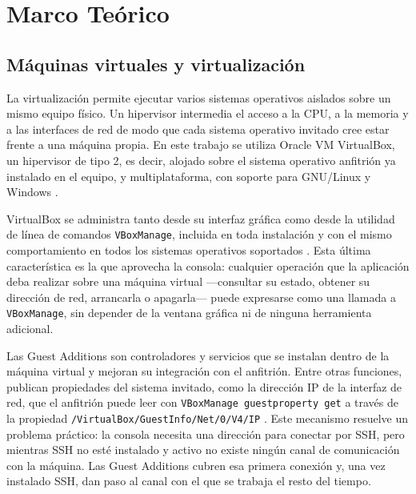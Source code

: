 \section{Marco Teórico}
\label{sec:marco-teorico}

\subsection{Máquinas virtuales y virtualización}
\label{sec:mt-virtualizacion}

La virtualización permite ejecutar varios sistemas operativos aislados
sobre un mismo equipo físico. Un hipervisor intermedia el acceso a la
CPU, a la memoria y a las interfaces de red de modo que cada sistema
operativo invitado cree estar frente a una máquina propia. En este
trabajo se utiliza Oracle VM VirtualBox, un hipervisor de tipo 2, es
decir, alojado sobre el sistema operativo anfitrión ya instalado en el
equipo, y multiplataforma, con soporte para GNU/Linux y Windows
\parencite{virtualbox}.

VirtualBox se administra tanto desde su interfaz gráfica como desde la
utilidad de línea de comandos \texttt{VBoxManage}, incluida en toda
instalación y con el mismo comportamiento en todos los sistemas
operativos soportados \parencite{virtualbox}. Esta última característica
es la que aprovecha la consola: cualquier operación que la aplicación
deba realizar sobre una máquina virtual —consultar su estado, obtener su
dirección de red, arrancarla o apagarla— puede expresarse como una
llamada a \texttt{VBoxManage}, sin depender de la ventana gráfica ni de
ninguna herramienta adicional.

Las Guest Additions son controladores y servicios que se instalan dentro
de la máquina virtual y mejoran su integración con el anfitrión. Entre
otras funciones, publican propiedades del sistema invitado, como la
dirección IP de la interfaz de red, que el anfitrión puede leer con
\texttt{VBoxManage guestproperty get} a través de la propiedad
\texttt{/VirtualBox/GuestInfo/Net/0/V4/IP} \parencite{guestadditions}.
Este mecanismo resuelve un problema práctico: la consola necesita una
dirección para conectar por SSH, pero mientras SSH no esté instalado y
activo no existe ningún canal de comunicación con la máquina. Las Guest
Additions cubren esa primera conexión y, una vez instalado SSH, dan paso
al canal con el que se trabaja el resto del tiempo.


